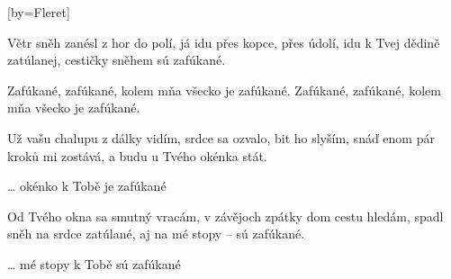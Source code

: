 [by={Fleret}]

\beginverse{}
Větr sněh zanésl z hor do polí, já idu přes kopce, přes údolí,
idu k Tvej dědině zatúlanej, cestičky sněhem sú zafúkané.   
\endverse{}

\beginchorus{}
Zafúkané, zafúkané, kolem mňa všecko je zafúkané.
Zafúkané, zafúkané, kolem mňa všecko je zafúkané.
\endchorus{}

\beginverse{}
Už vašu chalupu z dálky vidím, srdce sa ozvalo, bit ho slyším,
snáď enom pár kroků mi zostává, a budu u Tvého okénka stát.  
\endverse{}

\beginchorus{}
\ldots{} okénko k Tobě je zafúkané
\endchorus{}

\beginverse{}
Od Tvého okna sa smutný vracám, v závějoch zpátky dom cestu hledám,
spadl sněh na srdce zatúlané, aj na mé stopy -- sú zafúkané.   
\endverse{}

\beginchorus{}
\ldots{} mé stopy k Tobě sú zafúkané
\endchorus{}

\endsong{}
